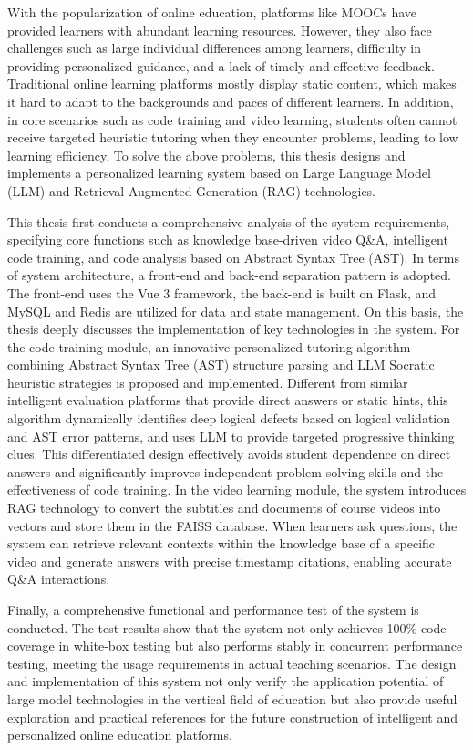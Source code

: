 
With the popularization of online education, platforms like MOOCs have provided learners with abundant learning resources. However, they also face challenges such as large individual differences among learners, difficulty in providing personalized guidance, and a lack of timely and effective feedback. Traditional online learning platforms mostly display static content, which makes it hard to adapt to the backgrounds and paces of different learners. In addition, in core scenarios such as code training and video learning, students often cannot receive targeted heuristic tutoring when they encounter problems, leading to low learning efficiency. To solve the above problems, this thesis designs and implements a personalized learning system based on Large Language Model (LLM) and Retrieval-Augmented Generation (RAG) technologies.

This thesis first conducts a comprehensive analysis of the system requirements, specifying core functions such as knowledge base-driven video Q\&A, intelligent code training, and code analysis based on Abstract Syntax Tree (AST). In terms of system architecture, a front-end and back-end separation pattern is adopted. The front-end uses the Vue 3 framework, the back-end is built on Flask, and MySQL and Redis are utilized for data and state management. On this basis, the thesis deeply discusses the implementation of key technologies in the system. For the code training module, an innovative personalized tutoring algorithm combining Abstract Syntax Tree (AST) structure parsing and LLM Socratic heuristic strategies is proposed and implemented. Different from similar intelligent evaluation platforms that provide direct answers or static hints, this algorithm dynamically identifies deep logical defects based on logical validation and AST error patterns, and uses LLM to provide targeted progressive thinking clues. This differentiated design effectively avoids student dependence on direct answers and significantly improves independent problem-solving skills and the effectiveness of code training. In the video learning module, the system introduces RAG technology to convert the subtitles and documents of course videos into vectors and store them in the FAISS database. When learners ask questions, the system can retrieve relevant contexts within the knowledge base of a specific video and generate answers with precise timestamp citations, enabling accurate Q\&A interactions.

Finally, a comprehensive functional and performance test of the system is conducted. The test results show that the system not only achieves 100\% code coverage in white-box testing but also performs stably in concurrent performance testing, meeting the usage requirements in actual teaching scenarios. The design and implementation of this system not only verify the application potential of large model technologies in the vertical field of education but also provide useful exploration and practical references for the future construction of intelligent and personalized online education platforms.